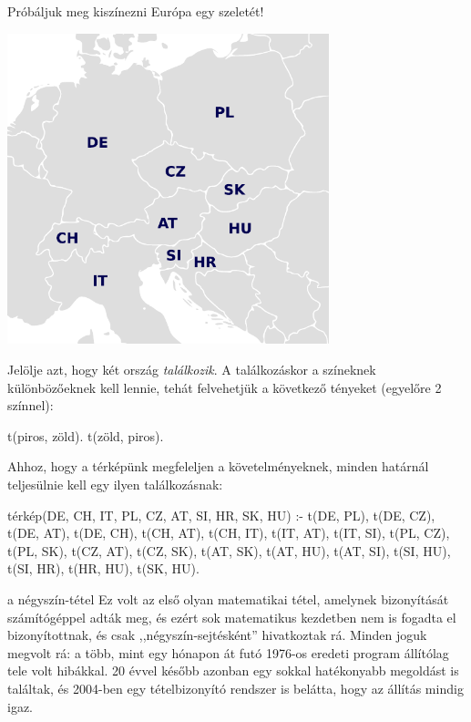 Próbáljuk meg kiszínezni Európa egy szeletét!

\begin{center}
  \includegraphics[width=0.7\textwidth]{images/europe.pdf}
\end{center}

Jelölje  azt, hogy két ország
\emph{találkozik}. A találkozáskor a színeknek
különbözőeknek kell lennie, tehát felvehetjük a
következő tényeket (egyelőre 2 színnel):
\begin{program}
t(piros, zöld). t(zöld, piros).
\end{program}
Ahhoz, hogy a térképünk megfeleljen a
követelményeknek, minden határnál teljesülnie kell
egy ilyen találkozásnak:
\begin{program}
térkép(DE, CH, IT, PL, CZ, AT, SI, HR, SK, HU) :-
    t(DE, PL), t(DE, CZ), t(DE, AT), t(DE, CH),
    t(CH, AT), t(CH, IT),
    t(IT, AT), t(IT, SI),
    t(PL, CZ), t(PL, SK),
    t(CZ, AT), t(CZ, SK),
    t(AT, SK), t(AT, HU), t(AT, SI),
    t(SI, HU), t(SI, HR),
    t(HR, HU),
    t(SK, HU).
\end{program}

\begin{infobox}{0.75}{a négyszín-tétel}
Ez volt az első olyan matematikai tétel, amelynek
bizonyítását számítógéppel adták meg, és ezért sok
matematikus kezdetben nem is fogadta el
bizonyítottnak, és csak ,,négyszín-sejtésként''
hivatkoztak rá. Minden joguk megvolt rá: a több,
mint egy hónapon át futó 1976-os eredeti program
állítólag tele volt hibákkal. 20 évvel később
azonban egy sokkal hatékonyabb megoldást is
találtak, és 2004-ben egy tételbizonyító rendszer is
belátta, hogy az állítás mindig igaz.
\end{infobox}

